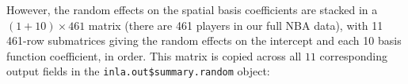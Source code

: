 \documentclass{article}\usepackage[]{graphicx}\usepackage[]{color}
\makeatletter
\newcommand{\hlnum}[1]{\textcolor[rgb]{0.686,0.059,0.569}{#1}}%
\newcommand{\hlstr}[1]{\textcolor[rgb]{0.192,0.494,0.8}{#1}}%
\newcommand{\hlopt}[1]{\textcolor[rgb]{0,0,0}{#1}}%
\newcommand{\hlstd}[1]{\textcolor[rgb]{0.345,0.345,0.345}{#1}}%
\newcommand{\hlkwb}[1]{\textcolor[rgb]{0.69,0.353,0.396}{#1}}%
\newcommand{\hlkwd}[1]{\textcolor[rgb]{0.737,0.353,0.396}{\textbf{#1}}}%
\newenvironment{kframe}{%
 \def\at@end@of@kframe{}%
 \ifinner\ifhmode%
  \def\at@end@of@kframe{\end{minipage}}%
  \begin{minipage}{\columnwidth}%
 \fi\fi%
 \def\FrameCommand##1{\hskip\@totalleftmargin \hskip-\fboxsep
 \colorbox{shadecolor}{##1}\hskip-\fboxsep
     \hskip-\linewidth \hskip-\@totalleftmargin \hskip\columnwidth}%
 \MakeFramed {\advance\hsize-\width
   \@totalleftmargin\z@ \linewidth\hsize
   \@setminipage}}%
 {\par\unskip\endMakeFramed%
 \at@end@of@kframe}
\makeatother
\begin{document}

However, the random effects on the spatial basis coefficients are stacked in a $(1 + 10) \times 461$ matrix (there are 461 players in our full NBA data), with 11 461-row submatrices giving the random effects on the intercept and each 10 basis function coefficient, in order. This matrix is copied across all $11$ corresponding output fields in the \texttt{inla.out\$summary.random} object:
\end{document}
